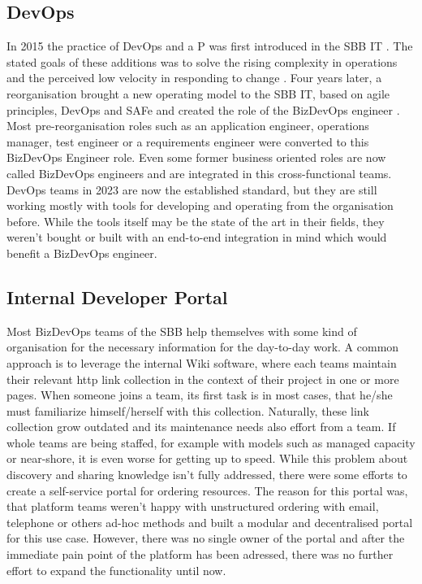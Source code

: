 \documentclass[a4paper,12pt]{article}
\begin{document}
    \subsection{DevOps}
    \label{subsec:sbbdevops}
    In 2015 the practice of DevOps and a P was first introduced in the SBB IT .
    The stated goals of these additions was to solve the rising complexity in operations and the perceived low velocity
    in responding to change\parencite{sbbdevops} .
    Four years later, a reorganisation brought a new operating model to the SBB IT, based on agile principles, DevOps and SAFe
    and created the role of the BizDevOps engineer\parencite{sbbagile} .
    Most pre-reorganisation roles such as an application engineer, operations manager, test engineer or a requirements engineer
    were converted to this BizDevOps Engineer role.
    Even some former business oriented roles are now called BizDevOps engineers and are integrated in this cross-functional
    teams.
    DevOps teams in 2023 are now the established standard, but they are still working mostly with tools for developing and
    operating from the organisation before.
    While the tools itself may be the state of the art in their fields, they weren't bought or built with an end-to-end
    integration in mind which would benefit a BizDevOps engineer.

    \subsection{Internal Developer Portal}
    \label{subsec:sbbportal}
    Most BizDevOps teams of the SBB help themselves with some kind of organisation for the necessary information
    for the day-to-day work.
    A common approach is to leverage the internal Wiki software, where each teams maintain their relevant http link
    collection in the context of their project in one or more pages.
    When someone joins a team, its first task is in most cases, that he/she must familiarize himself/herself with this
    collection.
    Naturally, these link collection grow outdated and its maintenance needs also effort from a team.
    If whole teams are being staffed, for example with models such as managed capacity or near-shore, it is even worse
    for getting up to speed.
    While this problem about discovery and sharing knowledge isn't fully addressed, there were some efforts to create
    a self-service portal for ordering resources.
    The reason for this portal was, that platform teams weren't happy with unstructured ordering with email, telephone or
    others ad-hoc methods and built a modular and decentralised portal for this use case.
    However, there was no single owner of the portal and after the immediate pain point of the platform has been adressed,
    there was no further effort to expand the functionality until now.
\end{document}
